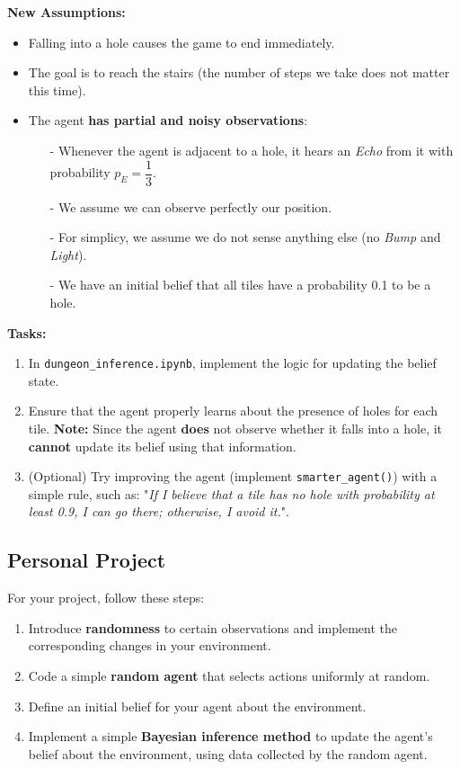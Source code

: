 \documentclass[11pt]{article}
\numberwithin{equation}{section}
\begin{document}
\textbf{New Assumptions:}
\begin{itemize}
    \item {\color{gray} Falling into a hole causes the game to end immediately.}
    \item The goal is to reach the stairs (the number of steps we take does not matter this time). 
    \item The agent \textbf{has partial and noisy observations}:
    \begin{itemize}
        \item[-]  Whenever the agent is adjacent to a hole, it hears an \emph{Echo} from it with probability $p_E = \dfrac{1}{3}$.
        \item[-]  We assume we can observe perfectly our position.
        \item[-]  For simplicy, we assume we do not sense anything else (no \emph{Bump} and \emph{Light}).
        \item[-]  We have an initial belief that all tiles have a probability 0.1 to be a hole.
    \end{itemize}
\end{itemize}

\textbf{Tasks:}
\begin{enumerate}
    \item In \texttt{dungeon\_inference.ipynb}, implement the logic for updating the belief state.
    \item Ensure that the agent properly learns about the presence of holes for each tile. \textbf{Note:} Since the agent \textbf{does} not observe whether it falls into a hole, it \textbf{cannot} update its belief using that information.
    \item (Optional) Try improving the agent (implement \texttt{smarter\_agent()}) with a simple rule, such as: "\textit{If I believe that a tile has no hole with probability at least 0.9, I can go there; otherwise, I avoid it.}".
\end{enumerate}

\subsection{Personal Project}

For your project, follow these steps:
\begin{enumerate}
\item Introduce \textbf{randomness} to certain observations and implement the corresponding changes in your environment.
\item Code a simple \textbf{random agent} that selects actions uniformly at random.
\item Define an initial belief for your agent about the environment.
\item Implement a simple \textbf{Bayesian inference method} to update the agent's belief about the environment, using data collected by the random agent.
\end{enumerate}
\end{document}
